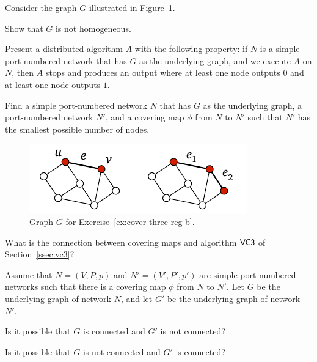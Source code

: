 \begin{ex}\label{ex:cover-three-reg-b}
    Consider the graph $G$ illustrated in Figure~\ref{fig:cover-ex-three-reg-b}.
    \begin{subex}
        \item Show that $G$ is not homogeneous.
        \item Present a distributed algorithm $A$ with the following property: if $N$ is a simple port-numbered network that has $G$ as the underlying graph, and we execute $A$ on $N$, then $A$ stops and produces an output where at least one node outputs $0$ and at least one node outputs $1$.
        \item Find a simple port-numbered network $N$ that has $G$ as the underlying graph, a port-numbered network $N'$, and a covering map $\phi$ from $N$ to $N'$ such that $N'$ has the smallest possible number of nodes.
    \end{subex}

    \begin{figure}
        \centering
        \includegraphics[page=\PCoverExThreeRegB]{figs.pdf}
        \caption{Graph $G$ for Exercise~\ref{ex:cover-three-reg-b}.}\label{fig:cover-ex-three-reg-b}
    \end{figure}
\end{ex}

\begin{ex}\label{ex:cover-cover}
    What is the connection between covering maps and algorithm $\textsf{VC3}$ of Section~\ref{ssec:vc3}?
\end{ex}

\begin{ex}
    Assume that $N = (V,P,p)$ and $N' = (V'\!,P'\!,p')$ are simple port-numbered networks such that there is a covering map $\phi$ from $N$ to $N'$. Let $G$ be the underlying graph of network $N$, and let $G'$ be the underlying graph of network~$N'$.
    \begin{subex}
        \item Is it possible that $G$ is connected and $G'$ is not connected?
        \item Is it possible that $G$ is not connected and $G'$ is connected?
    \end{subex}
\end{ex}

